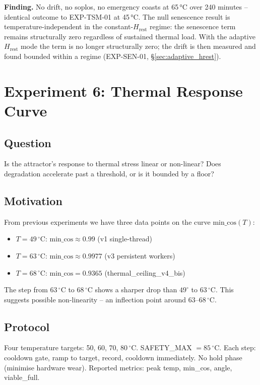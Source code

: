 \documentclass[11pt, a4paper]{article}
\begin{document}
\textbf{Finding.}
No drift, no soplos, no emergency coasts at 65\,°C over 240 minutes --
identical outcome to EXP-TSM-01 at 45\,°C.
The null senescence result is temperature-independent in the
constant-$H_\text{rest}$ regime: the senescence term remains structurally
zero regardless of sustained thermal load.
With the adaptive $H_\text{rest}$ mode the term is no longer structurally zero;
the drift is then measured and found bounded within a regime
(EXP-SEN-01, \S\ref{sec:adaptive_hrest}).

\section{Experiment 6: Thermal Response Curve}
\label{sec:thermal_ladder}

\subsection*{Question} Is the attractor's response to thermal stress linear
or non-linear?
Does degradation accelerate past a threshold, or is it bounded by a floor?

\subsection{Motivation}

From previous experiments we have three data points on the curve
$\text{min\_cos}(T)$:
\begin{itemize}
  \item $T = 49\,^\circ\mathrm{C}$: $\text{min\_cos} \approx 0.99$ (v1 single-thread)
  \item $T = 63\,^\circ\mathrm{C}$: $\text{min\_cos} \approx 0.9977$ (v3 persistent workers)
  \item $T = 68\,^\circ\mathrm{C}$: $\text{min\_cos} = 0.9365$ (thermal\_ceiling\_v4\_bis)
\end{itemize}

The step from $63\,^\circ\mathrm{C}$ to $68\,^\circ\mathrm{C}$ shows a sharper drop than
$49^\circ$ to $63\,^\circ\mathrm{C}$.
This suggests possible non-linearity -- an inflection point around $63$--$68\,^\circ\mathrm{C}$.

\subsection{Protocol}

Four temperature targets: 50, 60, 70, 80\,$^\circ$C.
SAFETY\_MAX $= 85\,^\circ\mathrm{C}$.
Each step: cooldown gate, ramp to target, record, cooldown immediately.
No hold phase (minimise hardware wear).
Reported metrics: peak temp, min\_cos, angle, viable\_full.
\end{document}
